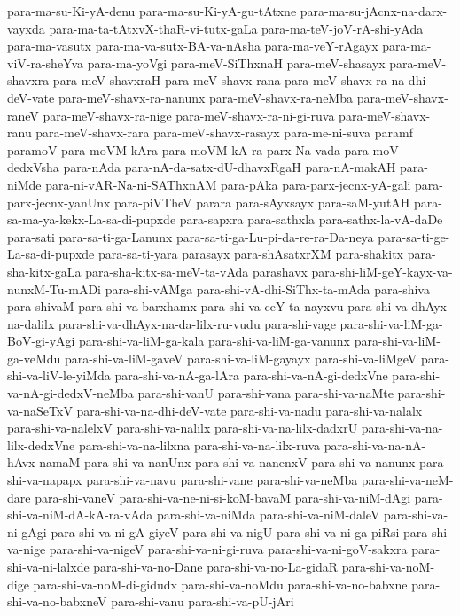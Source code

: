 {para-ma-su-Ki-yA-denu
para-ma-su-Ki-yA-gu-tAtxne
para-ma-su-jAcnx-na-darx-vayxda
para-ma-ta-tAtxvX-thaR-vi-tutx-gaLa
para-ma-teV-joV-rA-shi-yAda
para-ma-vasutx
para-ma-va-sutx-BA-va-nAsha
para-ma-veY-rAgayx
para-ma-viV-ra-sheYva
para-ma-yoVgi
para-meV-SiThxnaH
para-meV-shasayx
para-meV-shavxra
para-meV-shavxraH
para-meV-shavx-rana
para-meV-shavx-ra-na-dhi-deV-vate
para-meV-shavx-ra-nanunx
para-meV-shavx-ra-neMba
para-meV-shavx-raneV
para-meV-shavx-ra-nige
para-meV-shavx-ra-ni-gi-ruva
para-meV-shavx-ranu
para-meV-shavx-rara
para-meV-shavx-rasayx
para-me-ni-suva
paramf
paramoV
para-moVM-kAra
para-moVM-kA-ra-parx-Na-vada
para-moV-dedxVsha
para-nAda
para-nA-da-satx-dU-dhavxRgaH
para-nA-makAH
para-niMde
para-ni-vAR-Na-ni-SAThxnAM
para-pAka
para-parx-jecnx-yA-gali
para-parx-jecnx-yanUnx
para-piVTheV
parara
para-sAyxsayx
para-saM-yutAH
para-sa-ma-ya-kekx-La-sa-di-pupxde
para-sapxra
para-sathxla
para-sathx-la-vA-daDe
para-sati
para-sa-ti-ga-Lanunx
para-sa-ti-ga-Lu-pi-da-re-ra-Da-neya
para-sa-ti-ge-La-sa-di-pupxde
para-sa-ti-yara
parasayx
para-shAsatxrXM
para-shakitx
para-sha-kitx-gaLa
para-sha-kitx-sa-meV-ta-vAda
parashavx
para-shi-liM-geY-kayx-va-nunxM-Tu-mADi
para-shi-vAMga
para-shi-vA-dhi-SiThx-ta-mAda
para-shiva
para-shivaM
para-shi-va-barxhamx
para-shi-va-ceY-ta-nayxvu
para-shi-va-dhAyx-na-dalilx
para-shi-va-dhAyx-na-da-lilx-ru-vudu
para-shi-vage
para-shi-va-liM-ga-BoV-gi-yAgi
para-shi-va-liM-ga-kala
para-shi-va-liM-ga-vanunx
para-shi-va-liM-ga-veMdu
para-shi-va-liM-gaveV
para-shi-va-liM-gayayx
para-shi-va-liMgeV
para-shi-va-liV-le-yiMda
para-shi-va-nA-ga-lAra
para-shi-va-nA-gi-dedxVne
para-shi-va-nA-gi-dedxV-neMba
para-shi-vanU
para-shi-vana
para-shi-va-naMte
para-shi-va-naSeTxV
para-shi-va-na-dhi-deV-vate
para-shi-va-nadu
para-shi-va-nalalx
para-shi-va-nalelxV
para-shi-va-nalilx
para-shi-va-na-lilx-dadxrU
para-shi-va-na-lilx-dedxVne
para-shi-va-na-lilxna
para-shi-va-na-lilx-ruva
para-shi-va-na-nA-hAvx-namaM
para-shi-va-nanUnx
para-shi-va-nanenxV
para-shi-va-nanunx
para-shi-va-napapx
para-shi-va-navu
para-shi-vane
para-shi-va-neMba
para-shi-va-neM-dare
para-shi-vaneV
para-shi-va-ne-ni-si-koM-bavaM
para-shi-va-niM-dAgi
para-shi-va-niM-dA-kA-ra-vAda
para-shi-va-niMda
para-shi-va-niM-daleV
para-shi-va-ni-gAgi
para-shi-va-ni-gA-giyeV
para-shi-va-nigU
para-shi-va-ni-ga-piRsi
para-shi-va-nige
para-shi-va-nigeV
para-shi-va-ni-gi-ruva
para-shi-va-ni-goV-sakxra
para-shi-va-ni-lalxde
para-shi-va-no-Dane
para-shi-va-no-La-gidaR
para-shi-va-noM-dige
para-shi-va-noM-di-gidudx
para-shi-va-noMdu
para-shi-va-no-babxne
para-shi-va-no-babxneV
para-shi-vanu
para-shi-va-pU-jAri
}
